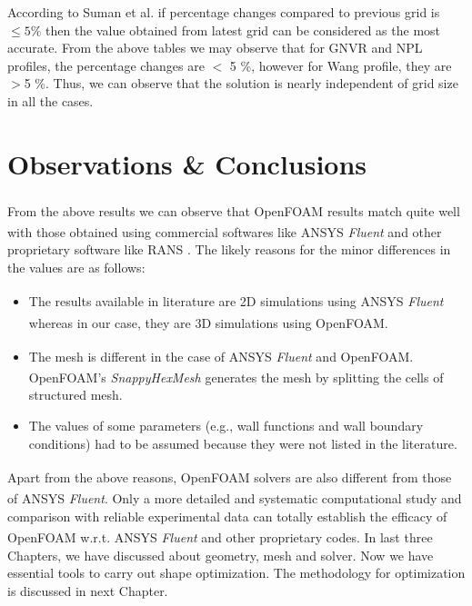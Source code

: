 According to Suman et al. \cite{Suman2011} if percentage changes compared to previous grid is $\le 5 \%$ then the value obtained from latest grid can be considered as the most accurate. From the above tables we may observe that for GNVR and NPL profiles, the percentage changes are $<$  5 \%, however for Wang profile, they are $>$5 \%. Thus, we can observe that the solution is nearly independent of grid size in all the cases.

\section{Observations \& Conclusions}

From the above results we can observe that OpenFOAM\textsuperscript{\textregistered} results match quite well with those obtained using commercial softwares like ANSYS\textsuperscript{\textregistered} \textit{Fluent} and other proprietary software like RANS \cite{Suman2011}. The likely reasons for the minor differences in the values are as follows:
\begin{itemize}
	\item The results available in literature are 2D simulations using ANSYS\textsuperscript{\textregistered} \textit{Fluent} whereas in our case, they are 3D simulations using OpenFOAM\textsuperscript{\textregistered}.
	\item The mesh is different in the case of ANSYS\textsuperscript{\textregistered} \textit{Fluent} and OpenFOAM\textsuperscript{\textregistered}. OpenFOAM\textsuperscript{\textregistered}'s \textit{SnappyHexMesh} generates the mesh by splitting the cells of structured mesh.
	\item The values of some parameters (e.g., wall functions and wall boundary conditions) had to be assumed because they were not listed in the literature.
\end{itemize}
Apart from the above reasons, OpenFOAM\textsuperscript{\textregistered} solvers are also different from those of ANSYS\textsuperscript{\textregistered} \textit{Fluent}. Only a more detailed and systematic computational study and comparison with reliable experimental data can totally establish the efficacy of OpenFOAM\textsuperscript{\textregistered} w.r.t. ANSYS\textsuperscript{\textregistered} \textit{Fluent} and other proprietary codes.
In last three Chapters, we have discussed about geometry, mesh and solver. Now we have essential tools to carry out shape optimization. The methodology for optimization is discussed in next Chapter.




